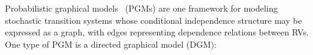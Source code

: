 \documentclass[11pt]{article}
\begin{document}


    Probabilistic graphical models~\cite{jordan2003introduction,koller2009probabilistic} (PGMs) are one framework for modeling stochastic transition systems whose conditional independence structure may be expressed as a graph, with edges representing dependence relations between RVs. One type of PGM is a directed graphical model (DGM):
\end{document}
